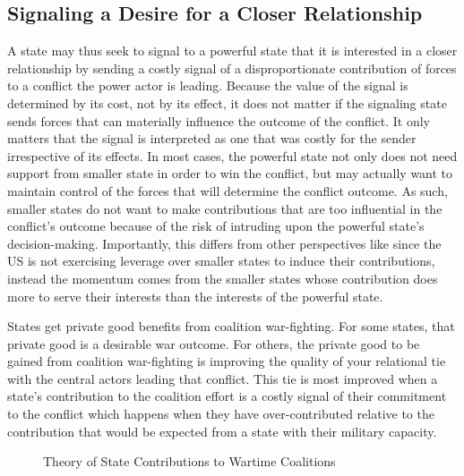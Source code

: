 \documentclass[12pt,letterpaper]{article}
\begin{document}
	\subsection{Signaling a Desire for a Closer Relationship}
		A state may thus seek to signal to a powerful state that it is interested in a closer relationship by sending a costly signal of a disproportionate contribution of forces to a conflict the power actor is leading. Because the value of the signal is determined by its cost, not by its effect, it does not matter if the signaling state sends forces that can materially influence the outcome of the conflict. It only matters that the signal is interpreted as one that was costly for the sender irrespective of its effects. In most cases, the powerful state not only does not need support from smaller state in order to win the conflict, but may actually want to maintain control of the forces that will determine the conflict outcome. As such, smaller states do not want to make contributions that are too influential in the conflict's outcome because of the risk of intruding upon the powerful state's decision-making. Importantly, this differs from other perspectives like \citet{bennett_burdensharingpersiangulf_1994} since the US is not exercising leverage over smaller states to induce their contributions, instead the momentum comes from the smaller states whose contribution does more to serve their interests than the interests of the powerful state.
		
		States get private good benefits from coalition war-fighting. For some states, that private good is a desirable war outcome.  For others, the private good to be gained from coalition war-fighting is improving the quality of your relational tie with the central actors leading that conflict. This tie is most improved when a state's contribution to the coalition effort is a costly signal of their commitment to the conflict which happens when they have over-contributed relative to the contribution that would be expected from a state with their military capacity.

		\begin{figure}[H]
		\centering
		\caption{Theory of State Contributions to Wartime Coalitions}
		\label{fig:theory}
		\end{figure}
		
\end{document}
